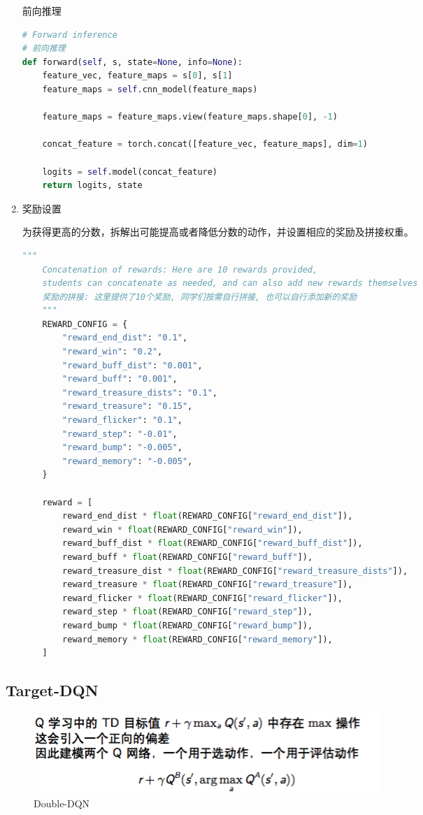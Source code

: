 \begin{enumerate}
前向推理

\begin{lstlisting}[language=Python]
# Forward inference
# 前向推理
def forward(self, s, state=None, info=None):
    feature_vec, feature_maps = s[0], s[1]
    feature_maps = self.cnn_model(feature_maps)

    feature_maps = feature_maps.view(feature_maps.shape[0], -1)

    concat_feature = torch.concat([feature_vec, feature_maps], dim=1)

    logits = self.model(concat_feature)
    return logits, state
\end{lstlisting}

 \item 奖励设置

为获得更高的分数，拆解出可能提高或者降低分数的动作，并设置相应的奖励及拼接权重。

\begin{lstlisting}[language=Python]
    """
    Concatenation of rewards: Here are 10 rewards provided,
    students can concatenate as needed, and can also add new rewards themselves
    奖励的拼接: 这里提供了10个奖励, 同学们按需自行拼接, 也可以自行添加新的奖励
    """
    REWARD_CONFIG = {
        "reward_end_dist": "0.1",
        "reward_win": "0.2",
        "reward_buff_dist": "0.001",
        "reward_buff": "0.001",
        "reward_treasure_dists": "0.1",
        "reward_treasure": "0.15",
        "reward_flicker": "0.1",
        "reward_step": "-0.01",
        "reward_bump": "-0.005",
        "reward_memory": "-0.005",
    }

    reward = [
        reward_end_dist * float(REWARD_CONFIG["reward_end_dist"]),
        reward_win * float(REWARD_CONFIG["reward_win"]),
        reward_buff_dist * float(REWARD_CONFIG["reward_buff_dist"]),
        reward_buff * float(REWARD_CONFIG["reward_buff"]),
        reward_treasure_dist * float(REWARD_CONFIG["reward_treasure_dists"]),
        reward_treasure * float(REWARD_CONFIG["reward_treasure"]),
        reward_flicker * float(REWARD_CONFIG["reward_flicker"]),
        reward_step * float(REWARD_CONFIG["reward_step"]),
        reward_bump * float(REWARD_CONFIG["reward_bump"]),
        reward_memory * float(REWARD_CONFIG["reward_memory"]),
    ]
\end{lstlisting}

\end{enumerate}


\subsection{Target-DQN}
\begin{figure}[H]
    \centering
    \includegraphics[width=0.8\linewidth]{pic/Double-DQN.png}
    \caption{ Double-DQN}
    \label{map}
\end{figure}


